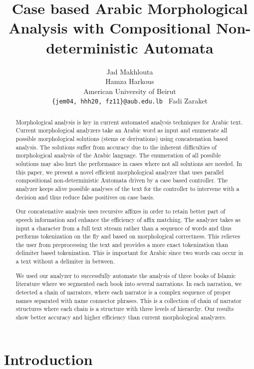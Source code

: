 \documentclass[11pt,letterpaper]{article}
\title{Case based Arabic Morphological Analysis with 
    Compositional Non-deterministic Automata }
\author{ Jad Makhlouta \\
  \And
Hamza Harkous \\
  American University of Beirut \\
  {\tt \{jem04, hhh20, fz11\}@aub.edu.lb }
  \And 
  Fadi Zaraket 
}
\date{}
\begin{document}
\maketitle

\begin{abstract}
 Morphological analysis is key in current automated analysis techniques 
  for Arabic text. 
  Current morphological analyzers take an Arabic word as input and 
  enumerate all possible morphological solutions (stems or 
  derivations) using concatenation based analysis.
  The solutions suffer from accuracy due to the inherent difficulties
  of morphological analysis of the Arabic language. 
  The enumeration of all possible solutions may also hurt the performance
  in cases where not all solutions are needed.
  In this paper, we present a novel efficient morphological analyzer that 
  uses parallel compositional non-deterministic Automata 
  driven by a case based controller.
  The analyzer keeps alive possible analyses of the text 
  for the controller to intervene with a decision and thus 
  reduce false positives on case basis.

  Our concatenative analysis uses recursive affixes in order to
  retain better part of speech information and enhance the 
  efficiency of affix matching. 
  The analyzer takes as input a character from a full text stream 
  rather than a sequence of words and thus performs tokenization
  on the fly and based on morphological correctness. 
  This relieves the user from preprocessing the text and provides
  a more exact tokenization than delimiter based tokenization. 
  This is important for Arabic since two words can occur in a text
  without a delimiter in between.

  We used our analyzer to successfully automate the analysis of 
  three books of Islamic literature where we segmented each book
  into several narrations. In each narration, we detected 
  a chain of narrators, where each narrator is a complex sequence of
  proper names separated with name connector phrases. 
  This is a collection of chain of narrator structures where each
  chain is a structure with three levels of hierarchy.
  Our results show better accuracy and higher efficiency than current 
  morphological analyzers. 
\end{abstract}

\section{Introduction}
\end{document}

